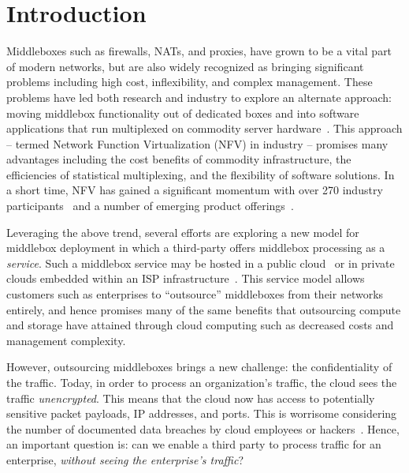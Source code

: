 
\section{Introduction}\label{sec:intro}

Middleboxes such as firewalls, NATs, and proxies, have grown to be a vital part of modern networks, but are 
also widely recognized as bringing significant problems including high cost, inflexibility, and complex management.  
These problems have led both research and industry to explore an alternate approach: moving middlebox functionality out of dedicated boxes and into 
software applications that run multiplexed on commodity server hardware~\cite{mb-manifesto,comb,aplomb,opennf,clickos,flowtags,etsi-nfv,domain20,opnfv}.
This approach -- termed Network Function Virtualization (NFV) in industry -- promises many advantages including the cost benefits of commodity infrastructure, 
the efficiencies of statistical multiplexing, and the flexibility of software solutions. 
In a short time, NFV has gained a significant momentum with over 270 industry participants~\cite{etsi-nfv} and a number of emerging product offerings~\cite{brocade,dell,juniper}.

Leveraging the above trend, several efforts are exploring a new model for middlebox deployment in which a third-party offers middlebox processing as a  
\emph{service}.
Such a middlebox service may be hosted in a public cloud~\cite{aplomb,zscaler,aryaka} or in private clouds embedded within an ISP 
infrastructure~\cite{domain20, telefonica}.  
This service model allows customers such as enterprises to ``outsource'' middleboxes from their networks entirely, and hence promises many of the same 
benefits that outsourcing compute and storage have attained through cloud computing such as decreased costs and management complexity.%

However, outsourcing middleboxes brings a new challenge: the confidentiality of the traffic. 
Today, in order to process an organization's traffic, the cloud sees the traffic {\em unencrypted}.  This means that the cloud 
now has access to potentially sensitive packet payloads,  IP addresses, and ports. This is 
worrisome considering the number of documented data breaches by cloud employees or hackers~\cite{PrivacyRecords}.
Hence, an important question is: can we enable a third party to process traffic for an enterprise, {\em without seeing the enterprise's traffic}?

